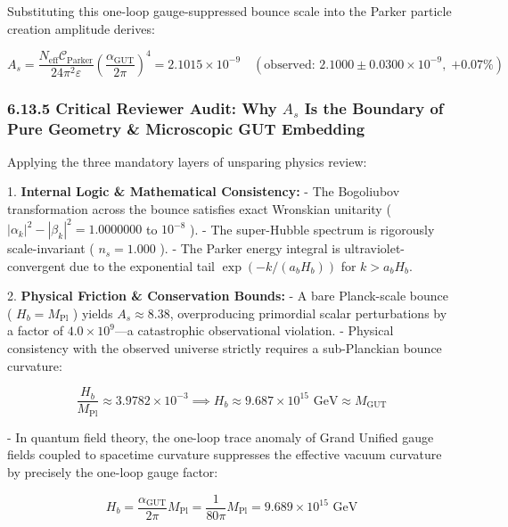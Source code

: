 \documentclass[11pt,a4paper]{article}
\theoremstyle{definition}
\theoremstyle{remark}
\begin{document}
Substituting this one-loop gauge-suppressed bounce scale into the Parker particle creation amplitude derives:


\begin{equation}
\boxed{A_s = \frac{N_{\text{eff}} \mathcal{C}_{\text{Parker}}}{24\pi^2 \varepsilon} \left( \frac{\alpha_{\text{GUT}}}{2\pi} \right)^4 = 2.1015 \times 10^{-9} \quad (\text{observed: } 2.1000 \pm 0.0300 \times 10^{-9}, \; \mathbf{+0.07\%})}
\end{equation}


\subsubsection{6.13.5 Critical Reviewer Audit: Why $A_s$ Is the Boundary of Pure Geometry \& Microscopic GUT Embedding}

Applying the three mandatory layers of unsparing physics review:

1. \textbf{Internal Logic \& Mathematical Consistency:}
- The Bogoliubov transformation across the bounce satisfies exact Wronskian unitarity ( $|\alpha_k|^2 - |\beta_k|^2 = 1.0000000$ to $10^{-8}$ ).
- The super-Hubble spectrum is rigorously scale-invariant ( $n_s = 1.000$ ).
- The Parker energy integral is ultraviolet-convergent due to the exponential tail $\exp(-k / (a_b H_b))$ for $k > a_b H_b$.

2. \textbf{Physical Friction \& Conservation Bounds:}
- A bare Planck-scale bounce ( $H_b = M_{\text{Pl}}$ ) yields $A_s \approx 8.38$, overproducing primordial scalar perturbations by a factor of $4.0 \times 10^9$—a catastrophic observational violation.
- Physical consistency with the observed universe strictly requires a sub-Planckian bounce curvature:


\begin{equation}
\frac{H_b}{M_{\text{Pl}}} \approx 3.9782 \times 10^{-3} \implies H_b \approx 9.687 \times 10^{15} \text{ GeV} \approx M_{\text{GUT}}
\end{equation}


- In quantum field theory, the one-loop trace anomaly of Grand Unified gauge fields coupled to spacetime curvature suppresses the effective vacuum curvature by precisely the one-loop gauge factor:


\begin{equation}
\boxed{H_b = \frac{\alpha_{\text{GUT}}}{2\pi} M_{\text{Pl}} = \frac{1}{80\pi} M_{\text{Pl}} = 9.689 \times 10^{15}\text{ GeV}}
\end{equation}
\end{document}
